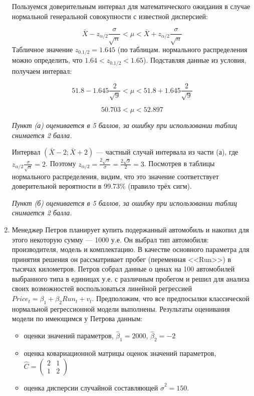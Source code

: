 \documentclass[pdftex,12pt,a4paper]{article}
\begin{document}
\begin{enumerate}
\solution


Пользуемся доверительным интервал для математического ожидания в случае нормальной генеральной совокупности с известной дисперсией:

\[
\bar{X}-z_{\alpha/2}\frac{\sigma}{\sqrt{n}} <\mu<\bar{X}+z_{\alpha/2}\frac{\sigma}{\sqrt{n}}
\]
Табличное значение $z_{0.1/2}=1.645$ (по таблицам. нормального распределения можно определить, что $1.64<z_{0.1/2}<1.65$). Подставляя данные из условия, получаем интервал:

\[
51.8-1.645\frac{2}{\sqrt{9}}<\mu <51.8+1.645\frac{2}{\sqrt{9}}
\]

\[
50.703 < \mu < 52.897
\]


\textit{Пункт (а) оценивается в 5 баллов, за ошибку при использовании таблиц снимается 2 балла.}

Интервал $(\bar{X}-2;\bar{X}+2)$ --- частный случай интервала из части (а), где $z_{\alpha/2}\frac{\sigma}{\sqrt{n}}=2$. Поэтому $z_{\alpha/2}=\frac{2\sqrt{n}}{\sigma}=\frac{2\sqrt{9}}{2}=3$. Посмотрев в таблицы нормального распределения, видим, что это значение соответствует доверительной вероятности в 99.73\% (правило трёх сигм).

\textit{Пункт (б) оценивается в 5 баллов, за ошибку при использовании таблиц снимается 2 балла.}


\vspace{6pt}

\item Менеджер Петров планирует купить подержанный автомобиль и накопил для этого некоторую сумму --- 1000 у.е. Он выбрал тип автомобиля: производителя, модель и комплектацию. В качестве основного параметра для принятия решения он рассматривает пробег (переменная <<Run>>) в тысячах километров. Петров собрал данные о ценах на 100 автомобилей выбранного типа в единицах у.е. с различным пробегом и решил для анализа своих возможностей воспользоваться линейной регрессией $Price_t=\beta_1+\beta_2 Run_t+v_t$. Предположим, что все предпосылки классической нормальной регрессионной модели выполнены. Результаты оценивания модели по имеющимся у Петрова данным: 
\begin{itemize}
\item оценки значений параметров, $\hat{\beta}_1=2000$, $\hat{\beta}_2=-2$
\item оценка ковариационной матрицы оценок значений параметров, $\hat{C}=
\begin{pmatrix}
2 & 1 \\
1 & 2 
\end{pmatrix}$
\item оценка дисперсии случайной составляющей $\hat{\sigma}^2=150$.
\end{itemize}


\end{enumerate}
\end{document}
